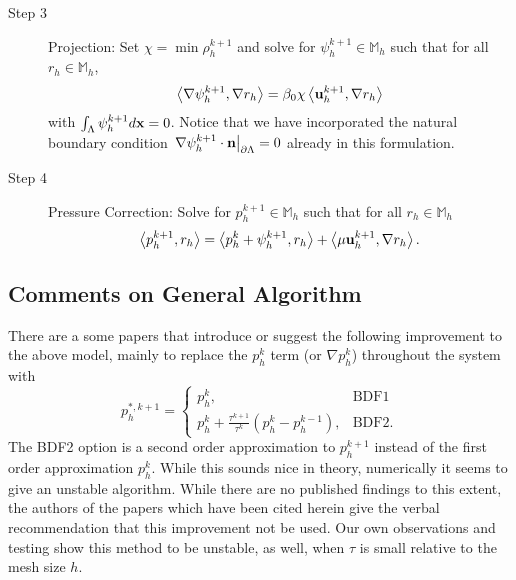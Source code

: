 \documentclass[letterpaper]{erdc}
\begin{document}
\begin{description}
\item[Step 3] Projection: Set $\chi = \min \rho_h^{k+1}$ and solve for $\psi_h^{k+1}\in \mathbb{M}_h$ such that for all $r_h\in \mathbb{M}_h$,
\begin{equation}
 \left\langle \nabla \psi_h^{k+1}, \nabla r_h \right\rangle = \beta_0 \chi \left\langle \textbf{u}_h^{k+1}, \nabla r_h \right\rangle
\end{equation}
with $\int_{\Lambda}\psi_h^{k+1}d\textbf{x} = 0$.  Notice that we have incorporated the natural boundary condition $\left.\nabla\psi_h^{k+1}\cdot\textbf{n}\right|_{\partial\Lambda} = 0 $ already in this formulation.  

\item[Step 4] Pressure Correction: Solve for $p_h^{k+1}\in \mathbb{M}_h$ such that for all $r_h\in \mathbb{M}_h$
\begin{equation}
  \left\langle p_h^{k+1}, r_h \right\rangle = \left\langle p_h^{k} + \psi_h^{k+1}, r_h \right\rangle + \left\langle \mu \textbf{u}_h^{k+1}, \nabla r_h \right\rangle.
\end{equation}
\end{description}

%
%
\subsection{Comments on General Algorithm}
\begin{remark}
There are a some papers that introduce or suggest the following improvement to the above model, mainly to replace the $p^{k}_h$ term (or $\nabla p^{k}_h$) throughout the system with
\begin{equation}
  p_h^{*,k+1} = \begin{cases}
                p_h^{k}, & \mbox{BDF1}\\
                p_h^{k} + \frac{\tau^{k+1}}{\tau^{k}}\left( p_h^k - p_h^{k-1} \right), & \mbox{BDF2}.
                \end{cases}
\end{equation}
The BDF2 option is a second order approximation to $p^{k+1}_h$ instead of the first order approximation $p_h^k$.  While this sounds nice in theory, numerically it seems to give an unstable algorithm.  While there are no published findings to this extent, the authors of the papers which have been cited herein give the verbal recommendation that this improvement not be used.  Our own observations and testing show this method to be unstable, as well, when $\tau$ is small relative to the mesh size $h$.
\end{remark}
\end{document}
